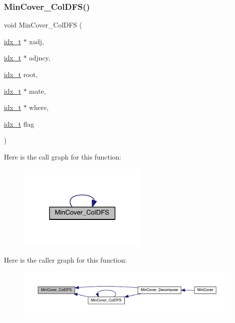 \subsubsection{\texorpdfstring{Min\+Cover\+\_\+\+Col\+D\+F\+S()}{MinCover\_ColDFS()}}
{\footnotesize\ttfamily void Min\+Cover\+\_\+\+Col\+D\+FS (\begin{DoxyParamCaption}\item[{\hyperlink{a00876_aaa5262be3e700770163401acb0150f52}{idx\+\_\+t} $\ast$}]{xadj,  }\item[{\hyperlink{a00876_aaa5262be3e700770163401acb0150f52}{idx\+\_\+t} $\ast$}]{adjncy,  }\item[{\hyperlink{a00876_aaa5262be3e700770163401acb0150f52}{idx\+\_\+t}}]{root,  }\item[{\hyperlink{a00876_aaa5262be3e700770163401acb0150f52}{idx\+\_\+t} $\ast$}]{mate,  }\item[{\hyperlink{a00876_aaa5262be3e700770163401acb0150f52}{idx\+\_\+t} $\ast$}]{where,  }\item[{\hyperlink{a00876_aaa5262be3e700770163401acb0150f52}{idx\+\_\+t}}]{flag }\end{DoxyParamCaption})}

Here is the call graph for this function\+:\nopagebreak
\begin{figure}[H]
\begin{center}
\leavevmode
\includegraphics[width=180pt]{a00245_a4c92a2e434179f264498adf840127095_cgraph}
\end{center}
\end{figure}
Here is the caller graph for this function\+:\nopagebreak
\begin{figure}[H]
\begin{center}
\leavevmode
\includegraphics[width=350pt]{a00245_a4c92a2e434179f264498adf840127095_icgraph}
\end{center}
\end{figure}
\mbox{\label{a00245_ad5ccba21af8f9ed8b2faa69d4503ecfd}} 
